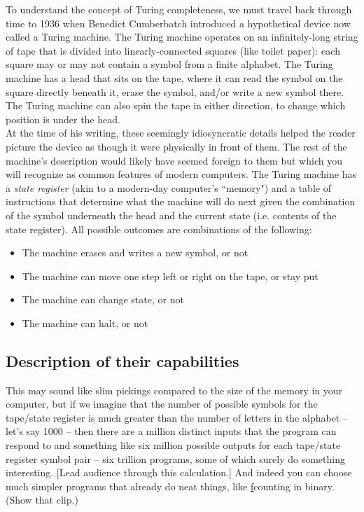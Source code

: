 \documentclass{article}
\begin{document}
To understand the concept of Turing completeness, we must travel back through time to 1936 when Benedict Cumberbatch introduced a hypothetical device now called a Turing machine. The Turing machine operates on an infinitely-long string of tape that is divided into linearly-connected squares (like toilet paper): each square may or may not contain a symbol from a finite alphabet. The Turing machine has a head that sits on the tape, where it can read the symbol on the square directly beneath it, erase the symbol, and/or write a new symbol there. The Turing machine can also spin the tape in either direction, to change which position is under the head.\\

At the time of his writing, these seemingly idiosyncratic details helped the reader picture the device as though it were physically in front of them. The rest of the machine's description would likely have seemed foreign to them but which you will recognize as common features of modern computers. The Turing machine has a \textit{state register} (akin to a modern-day computer's ``memory") and a table of instructions that determine what the machine will do next given the combination of the symbol underneath the head and the current state (i.e. contents of the state register). All possible outcomes are combinations of the following:
\begin{itemize}
\item The machine erases and writes a new symbol, or not
\item The machine can move one step left or right on the tape, or stay put
\item The machine can change state, or not
\item The machine can halt, or not
\end{itemize}

\subsection*{Description of their capabilities}

This may sound like slim pickings compared to the size of the memory in your computer, but if we imagine that the number of possible symbols for the tape/state register is much greater than the number of letters in the alphabet -- let's say 1000 -- then there are a million distinct inputs that the program can respond to and something like six million possible outputs for each tape/state register symbol pair -- six trillion programs, some of which surely do something interesting. [Lead audience through this calculation.] And indeed you can choose much simpler programs that already do neat things, like \href{http://aturingmachine.com/examples.php}f{counting in binary}. (Show that clip.)\\
\end{document}
